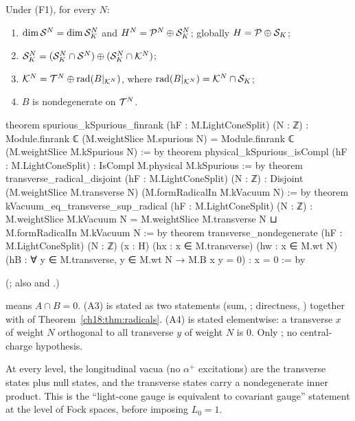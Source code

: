 \begin{theorem}\label{ch18:thm:A14}
Under (F1), for every $N$:
\begin{enumerate}[label=(A\arabic*)]
\item $\dim\mathcal{S}^N=\dim\mathcal{S}_K^N$ and $H^N=\mathcal{P}^N\oplus\mathcal{S}_K^N$; globally $H=\mathcal{P}\oplus\mathcal{S}_K$;
\item $\mathcal{S}_K^N=(\mathcal{S}_K^N\cap\mathcal{S}^N)\oplus(\mathcal{S}_K^N\cap\mathcal{K}^N)$;
\item $\mathcal{K}^N=\mathcal{T}^N\oplus\mathrm{rad}(B|_{\mathcal{K}^N})$, where $\mathrm{rad}(B|_{\mathcal{K}^N})=\mathcal{K}^N\cap\mathcal{S}_K$;
\item $B$ is nondegenerate on $\mathcal{T}^N$.
\end{enumerate}
\end{theorem}
\begin{leancode}
theorem spurious_kSpurious_finrank (hF : M.LightConeSplit) (N : ℤ) :
    Module.finrank ℂ (M.weightSlice M.spurious N) =
      Module.finrank ℂ (M.weightSlice M.kSpurious N) := by
theorem physical_kSpurious_isCompl (hF : M.LightConeSplit) :
    IsCompl M.physical M.kSpurious := by
theorem transverse_radical_disjoint (hF : M.LightConeSplit) (N : ℤ) :
    Disjoint (M.weightSlice M.transverse N) (M.formRadicalIn M.kVacuum N) := by
theorem kVacuum_eq_transverse_sup_radical (hF : M.LightConeSplit) (N : ℤ) :
    M.weightSlice M.kVacuum N =
      M.weightSlice M.transverse N ⊔ M.formRadicalIn M.kVacuum N := by
theorem transverse_nondegenerate (hF : M.LightConeSplit) (N : ℤ) (x : H)
    (hx : x ∈ M.transverse) (hw : x ∈ M.wt N)
    (hB : ∀ y ∈ M.transverse, y ∈ M.wt N → M.B x y = 0) : x = 0 := by
\end{leancode}
(; also 
and .)
\begin{dictionary}
 means $A\cap B=0$.  (A3) is stated as two statements (sum, ;
directness, ) together with  of
Theorem~\ref{ch18:thm:radicals}.  (A4) is stated elementwise: a transverse $x$ of weight $N$ orthogonal to
all transverse $y$ of weight $N$ is $0$.  Only ; no central-charge hypothesis.
\end{dictionary}
\begin{physics}
At every level, the longitudinal vacua (no $\alpha^+$ excitations) are the transverse states plus null
states, and the transverse states carry a nondegenerate inner product.  This is the ``light-cone gauge
is equivalent to covariant gauge'' statement at the level of Fock spaces, before imposing $L_0=1$.
\end{physics}
